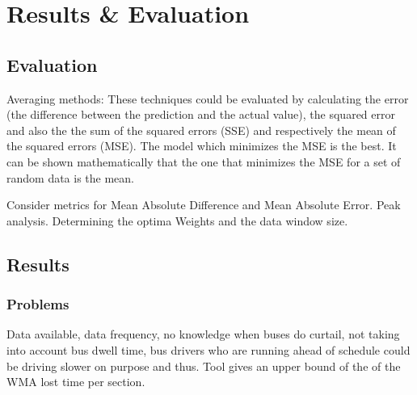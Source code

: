 \chapter{Results \& Evaluation}

\section{Evaluation}

Averaging methods: These techniques could be evaluated by calculating the error (the difference between the prediction and the actual value), the squared error and also the the sum of the squared errors (SSE) and respectively the mean of the squared errors (MSE).
The model which minimizes the MSE is the best. It can be shown mathematically that the one that minimizes the MSE for a set of random data is the mean.

Consider metrics for Mean Absolute Difference and Mean Absolute Error. Peak analysis.
Determining the optima Weights and the data window size.
\section{Results}

\subsection{Problems}
Data available, data frequency, no knowledge when buses do curtail, not taking into account bus dwell time, bus drivers who are running ahead of schedule could be driving slower on purpose and thus. Tool gives an upper bound of the of the WMA lost time per section. 